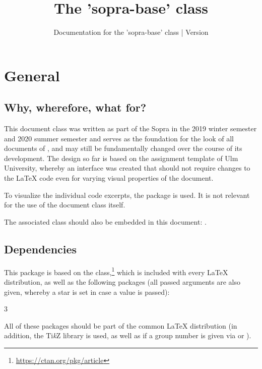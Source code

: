 \documentclass{sopra-base}
\title{The 'sopra-base' class}
\subtitle[Documentation for the 'sopra-base' class]{Documentation for the 'sopra-base' class | Version \thesobversion}
\begin{document}
    \maketitle%
%
%

\section{General}
\subsection{Why, wherefore, what for?}
    This \LaTeXe document class was written as part of the Sopra in the
    2019 winter semester and 2020 summer semester and serves as the
    foundation for the look of all documents of , and may
    still be fundamentally changed over the course of its development. The
    design so far is based on the assignment template of Ulm University,
    whereby an interface was created that should not require changes to the
    \LaTeX{} code even for varying visual properties of the
    document.\par
    To visualize the individual code excerpts, the
     package is used. It is not relevant for the use of
    the document class itself.\par
    The associated class should also be embedded in this document: .
\subsection{Dependencies}
    This package is based on the  class,\footnote{\url{https://ctan.org/pkg/article}}
    which is included with every \LaTeX{} distribution,
    as well as the following packages (all passed arguments are also
    given, whereby a star is set in case a value is passed):
    \begin{multicols}{3}
    \end{multicols}
    All of these packages should be part of the common \LaTeX{} distribution
    (in addition, the Ti\textit{k}Z library  is used, as well as 
    if a group number is given via  or ).
\end{document}
